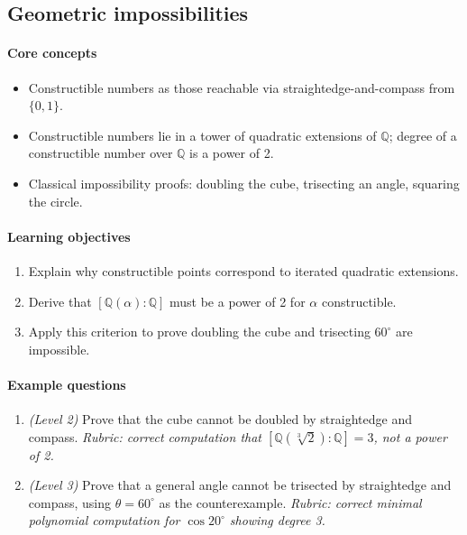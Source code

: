 \documentclass{article}
\begin{document}
\subsection{Geometric impossibilities}
\paragraph{Core concepts}
\begin{itemize}[nosep]
  \item Constructible numbers as those reachable via straightedge-and-compass from $\{0,1\}$.
  \item Constructible numbers lie in a tower of quadratic extensions of $\mathbb{Q}$; degree of a constructible number over $\mathbb{Q}$ is a power of 2.
  \item Classical impossibility proofs: doubling the cube, trisecting an angle, squaring the circle.
\end{itemize}
\paragraph{Learning objectives}
\begin{enumerate}[nosep]
  \item Explain why constructible points correspond to iterated quadratic extensions.
  \item Derive that $[\mathbb{Q}(\alpha):\mathbb{Q}]$ must be a power of 2 for $\alpha$ constructible.
  \item Apply this criterion to prove doubling the cube and trisecting $60^\circ$ are impossible.
\end{enumerate}
\paragraph{Example questions}
\begin{enumerate}[nosep]
  \item \emph{(Level 2)} Prove that the cube cannot be doubled by straightedge and compass. \emph{Rubric: correct computation that $[\mathbb{Q}(\sqrt[3]{2}):\mathbb{Q}]=3$, not a power of 2.}
  \item \emph{(Level 3)} Prove that a general angle cannot be trisected by straightedge and compass, using $\theta = 60^\circ$ as the counterexample. \emph{Rubric: correct minimal polynomial computation for $\cos 20^\circ$ showing degree 3.}
\end{enumerate}

\end{document}
